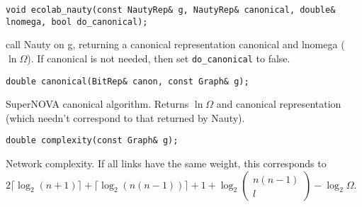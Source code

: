 \begin{verbatim}
void ecolab_nauty(const NautyRep& g, NautyRep& canonical, double& lnomega, bool do_canonical);
\end{verbatim}
call Nauty on g, returning a canonical representation canonical and
lnomega ($\ln\Omega$). If canonical is not needed, then set \verb+do_canonical+ to
false.

\begin{verbatim}
double canonical(BitRep& canon, const Graph& g);
\end{verbatim}
SuperNOVA canonical algorithm. Returns $\ln\Omega$ and canonical
representation (which needn't correspond to that returned by Nauty).

\begin{verbatim}
double complexity(const Graph& g);
\end{verbatim}
Network complexity. If all links have the same weight, this
corresponds to $2\lceil\log_2(n+1)\rceil+\lceil\log_2(n(n-1))\rceil+1+
\log_2\left(\begin{array}{c}n(n-1)\\l\end{array}\right) - \log_2\Omega$.
